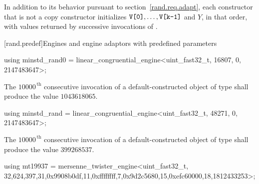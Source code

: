 \pnum
In addition to its behavior
pursuant to section~\ref{rand.req.adapt},
each constructor%
that is not a copy constructor
initializes $\texttt{V[0]}, \ldots, \texttt{V[k-1]}$ and $Y$,
in that order,
with values returned by successive invocations of .%




[rand.predef]{Engines and engine adaptors with predefined parameters}%
%
%

%
%
\begin{itemdecl}
using minstd_rand0 =
      linear_congruential_engine<uint_fast32_t, 16807, 0, 2147483647>;
\end{itemdecl}

\begin{itemdescr}
\pnum\required
 The $10000^{\,\mathrm{th}}$ consecutive invocation
 of a default-constructed object
 of type 
 shall produce the value $1043618065$.
\end{itemdescr}

%
%
\begin{itemdecl}
using minstd_rand =
      linear_congruential_engine<uint_fast32_t, 48271, 0, 2147483647>;
\end{itemdecl}

\begin{itemdescr}
\pnum\required
 The $10000^{\,\mathrm{th}}$ consecutive invocation
 of a default-constructed object
 of type 
 shall produce the value $399268537$.
\end{itemdescr}

%
%
\begin{itemdecl}
using mt19937 =
      mersenne_twister_engine<uint_fast32_t,
       32,624,397,31,0x9908b0df,11,0xffffffff,7,0x9d2c5680,15,0xefc60000,18,1812433253>;
\end{itemdecl}

